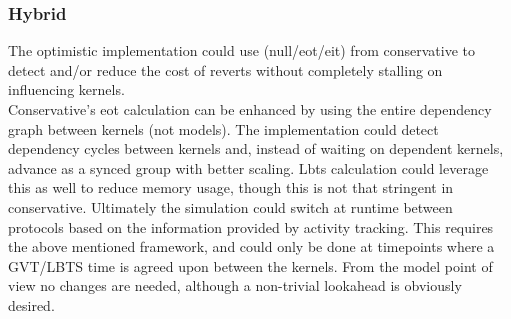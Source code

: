 \subsubsection{Hybrid}
The optimistic implementation could use (null/eot/eit) from conservative to detect and/or reduce the cost of reverts without completely stalling on influencing kernels.\\
Conservative's eot calculation can be enhanced by using the entire dependency graph between kernels (not models). The implementation could detect dependency cycles between kernels and, instead of waiting on dependent kernels, advance as a synced group with better scaling. Lbts calculation could leverage this as well to reduce memory usage, though this is not that stringent in conservative.
Ultimately the simulation could switch at runtime between protocols based on the information provided by activity tracking. This requires the above mentioned framework, and could only be done at timepoints where a GVT/LBTS time is agreed upon between the kernels. From the model point of view no changes are needed, although a non-trivial lookahead is obviously desired. 
